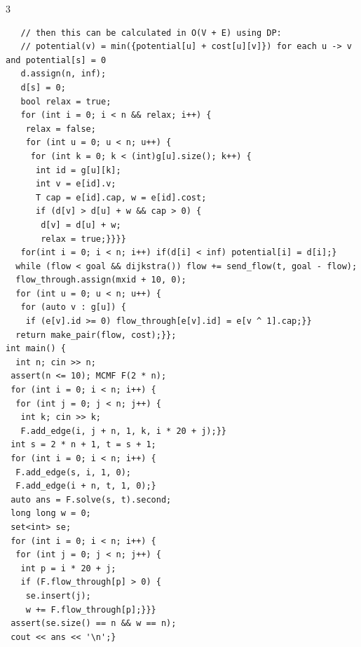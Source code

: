 \documentclass[8pt,a4paper,onesided]{article}
\makeatletter
\renewcommand{\subsection}{\@startsection{subsection}{2}{0mm}
    {-1ex plus -0.5ex minus -0.2ex} %
    {0.5ex plus .2ex}                %
    {\normalfont\large\bfseries}}    %
\makeatother
\begin{document}
\begin{multicols}{3}
\begin{verbatim}
   // then this can be calculated in O(V + E) using DP:
   // potential(v) = min({potential[u] + cost[u][v]}) for each u -> v and potential[s] = 0
   d.assign(n, inf);
   d[s] = 0;
   bool relax = true;
   for (int i = 0; i < n && relax; i++) {
    relax = false;
    for (int u = 0; u < n; u++) {
     for (int k = 0; k < (int)g[u].size(); k++) {
      int id = g[u][k];
      int v = e[id].v;
      T cap = e[id].cap, w = e[id].cost;
      if (d[v] > d[u] + w && cap > 0) {
       d[v] = d[u] + w;
       relax = true;}}}}
   for(int i = 0; i < n; i++) if(d[i] < inf) potential[i] = d[i];}
  while (flow < goal && dijkstra()) flow += send_flow(t, goal - flow);
  flow_through.assign(mxid + 10, 0);
  for (int u = 0; u < n; u++) {
   for (auto v : g[u]) {
    if (e[v].id >= 0) flow_through[e[v].id] = e[v ^ 1].cap;}}
  return make_pair(flow, cost);}};
int main() {
  int n; cin >> n;
 assert(n <= 10); MCMF F(2 * n);
 for (int i = 0; i < n; i++) {
  for (int j = 0; j < n; j++) {
   int k; cin >> k;
   F.add_edge(i, j + n, 1, k, i * 20 + j);}}
 int s = 2 * n + 1, t = s + 1;
 for (int i = 0; i < n; i++) {
  F.add_edge(s, i, 1, 0);
  F.add_edge(i + n, t, 1, 0);}
 auto ans = F.solve(s, t).second;
 long long w = 0;
 set<int> se;
 for (int i = 0; i < n; i++) {
  for (int j = 0; j < n; j++) {
   int p = i * 20 + j;
   if (F.flow_through[p] > 0) {
    se.insert(j);
    w += F.flow_through[p];}}}
 assert(se.size() == n && w == n);
 cout << ans << '\n';}
\end{verbatim}

\end{multicols}
\end{document}
